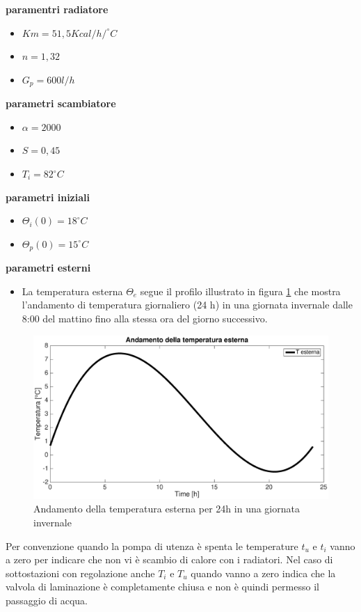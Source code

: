 \documentclass[laurea,oneside,11pt]{USiena_tesiLM}
\begin{document}
\textbf{paramentri radiatore}
\begin{itemize}
\item[]$Km = 51,5 Kcal/h / ^{\circ}C$  
\item[]$n = 1,32$
\item[]$G_p = 600 l/h$
\end{itemize}

\textbf{parametri scambiatore}
\begin{itemize}
\item[]$\alpha = 2000$
\item[]$S = 0,45 $
\item[]$T_i = 82 ^{\circ}C$
\end{itemize}

\textbf{parametri iniziali}
\begin{itemize}
\item[]$\Theta_i(0) = 18 ^{\circ}C$
\item[]$\Theta_p(0) = 15 ^{\circ}C$
\end{itemize}

\textbf{parametri esterni}
\begin{itemize}
\item[] La temperatura esterna $\Theta_e$ segue il profilo illustrato in figura \ref{fig:temp_est} che mostra l'andamento di temperatura giornaliero (24 h) in una giornata invernale dalle 8:00 del mattino fino alla stessa ora del giorno successivo. 
\end{itemize}

\begin{figure}[!h]
\centering
\includegraphics[width=\textwidth]{figure/temp_est} 
\caption{Andamento della temperatura esterna per 24h in una giornata invernale}
\label{fig:temp_est}
\end{figure}

Per convenzione quando la pompa di utenza è spenta le temperature $t_u$ e $t_i$ vanno a zero per indicare che non vi è scambio di calore con i radiatori. Nel caso di sottostazioni con regolazione anche $T_i$ e $T_u$ quando vanno a zero indica che la valvola di laminazione è completamente chiusa e non è quindi permesso il passaggio di acqua. 
\end{document}
